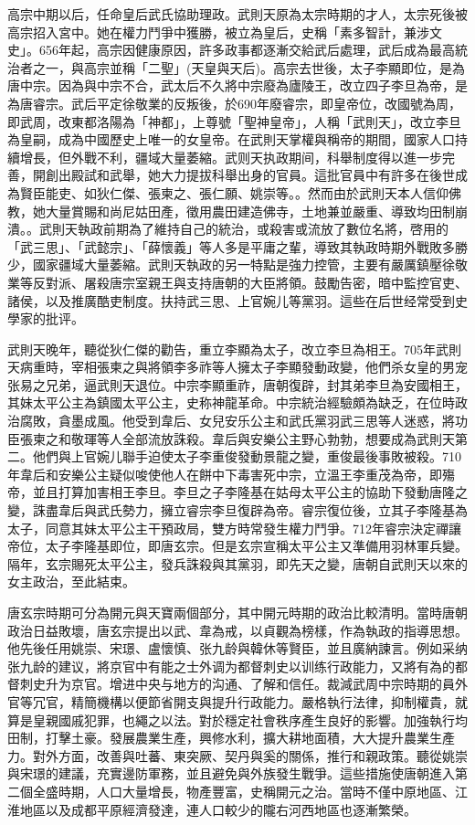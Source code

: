 高宗中期以后，任命皇后武氏協助理政。武則天原為太宗時期的才人，太宗死後被高宗招入宮中。她在權力鬥爭中獲勝，被立為皇后，史稱「素多智計，兼涉文史」。656年起，高宗因健康原因，許多政事都逐漸交給武后處理，武后成為最高統治者之一，與高宗並稱「二聖」(天皇與天后)。高宗去世後，太子李顯即位，是為唐中宗。因為與中宗不合，武太后不久將中宗廢為廬陵王，改立四子李旦為帝，是為唐睿宗。武后平定徐敬業的反叛後，於690年廢睿宗，即皇帝位，改國號為周，即武周，改東都洛陽為「神都」，上尊號「聖神皇帝」，人稱「武則天」，改立李旦為皇嗣，成為中國歷史上唯一的女皇帝。在武則天掌權與稱帝的期間，國家人口持續增長，但外戰不利，疆域大量萎縮。武则天执政期间，科舉制度得以進一步完善，開創出殿試和武舉，她大力提拔科舉出身的官員。這批官員中有許多在後世成為賢臣能吏、如狄仁傑、張柬之、張仁願、姚崇等。。然而由於武則天本人信仰佛教，她大量賞賜和尚尼姑田產，徵用農田建造佛寺，土地兼並嚴重、導致均田制崩潰。。武則天執政前期為了維持自己的統治，或殺害或流放了數位名將，啓用的「武三思」、「武懿宗」、「薛懷義」等人多是平庸之輩，導致其執政時期外戰敗多勝少，國家疆域大量萎縮。武則天執政的另一特點是強力控管，主要有嚴厲鎮壓徐敬業等反對派、屠殺唐宗室親王與支持唐朝的大臣將領。鼓勵告密，暗中監控官吏、諸侯，以及推廣酷吏制度。扶持武三思、上官婉儿等黨羽。這些在后世经常受到史學家的批评。

武則天晚年，聽從狄仁傑的勸告，重立李顯為太子，改立李旦為相王。705年武則天病重時，宰相張柬之與將領李多祚等人擁太子李顯發動政變，他們杀女皇的男宠张易之兄弟，逼武則天退位。中宗李顯重祚，唐朝復辟，封其弟李旦為安國相王，其妹太平公主為鎮國太平公主，史称神龍革命。中宗統治經驗頗為缺乏，在位時政治腐敗，貪墨成風。他受到韋后、女兒安乐公主和武氏黨羽武三思等人迷惑，將功臣張柬之和敬琿等人全部流放誅殺。韋后與安樂公主野心勃勃，想要成為武則天第二。他們與上官婉儿聯手迫使太子李重俊發動景龍之變，重俊最後事敗被殺。710年韋后和安樂公主疑似唆使他人在餅中下毒害死中宗，立溫王李重茂為帝，即殤帝，並且打算加害相王李旦。李旦之子李隆基在姑母太平公主的協助下發動唐隆之變，誅盡韋后與武氏勢力，擁立睿宗李旦復辟為帝。睿宗復位後，立其子李隆基為太子，同意其妹太平公主干預政局，雙方時常發生權力鬥爭。712年睿宗決定禪讓帝位，太子李隆基即位，即唐玄宗。但是玄宗宣稱太平公主又準備用羽林軍兵變。隔年，玄宗賜死太平公主，發兵誅殺與其黨羽，即先天之變，唐朝自武則天以來的女主政治，至此結束。

唐玄宗時期可分為開元與天寶兩個部分，其中開元時期的政治比較清明。當時唐朝政治日益敗壞，唐玄宗提出以武、韋為戒，以貞觀為榜樣，作為執政的指導思想。他先後任用姚崇、宋璟、盧懷慎、张九龄與韓休等賢臣，並且廣納諫言。例如采纳张九龄的建议，將京官中有能之士外调为都督刺史以训练行政能力，又將有為的都督刺史升为京官。增进中央与地方的沟通、了解和信任。裁減武周中宗時期的員外官等冗官，精簡機構以便節省開支與提升行政能力。嚴格執行法律，抑制權貴，就算是皇親國戚犯罪，也繩之以法。對於穩定社會秩序產生良好的影響。加強執行均田制，打擊土豪。發展農業生產，興修水利，擴大耕地面積，大大提升農業生產力。對外方面，改善與吐蕃、東突厥、契丹與奚的關係，推行和親政策。聽從姚崇與宋璟的建議，充實邊防軍務，並且避免與外族發生戰爭。這些措施使唐朝進入第二個全盛時期，人口大量增長，物產豐富，史稱開元之治。當時不僅中原地區、江淮地區以及成都平原經濟發達，連人口較少的隴右河西地區也逐漸繁榮。

